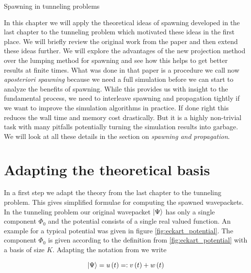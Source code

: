 \begin{chapter}{Spawning in tunneling problems}
\label{ch:spawntunneling}

In this chapter we will apply the theoretical ideas of spawning developed in the
last chapter to the tunneling problem which motivated these ideas in the first place.
We will briefly review the original work from the paper \cite{GHJ_tunneling_spawning}
and then extend these ideas further. We will explore the advantages of the new
projection method over the lumping method for spawning and see how this helps
to get better results at finite times. What was done in that paper is a procedure
we call now \emph{aposteriori spawning} because we need a full simulation before
we can start to analyze the benefits of spawning. While this provides us with
insight to the fundamental process, we need to interleave spawning and propagation
tightly if we want to improve the simulation algorithms in practice. If done
right this reduces the wall time and memory cost drastically. But it is a highly
non-trivial task with many pitfalls potentially turning the simulation results
into garbage. We will look at all these details in the section on
\emph{spawning and propagation}.


\section{Adapting the theoretical basis}

In a first step we adapt the theory from the last chapter to the tunneling
problem. This gives simplified formulae for computing the spawned wavepackets.
In the tunneling problem our original wavepacket $\Ket{\Psi}$ has only a single
component $\Phi_0$ and the potential consists of a single real valued function.
An example for a typical potential was given in figure \ref{fig:eckart_potential}.
The component $\Phi_0$ is given according to the definition from \eqref{fig:eckart_potential}
with a basis of size $K$. Adapting the notation from \cite{GHJ_tunneling_spawning}
we write

\begin{equation} \label{eq:decompose_psi_tunnel}
  \Ket{\Psi} = u\left( t \right) =: v\left( t \right) + w\left( t \right)
\end{equation}


\end{chapter}
